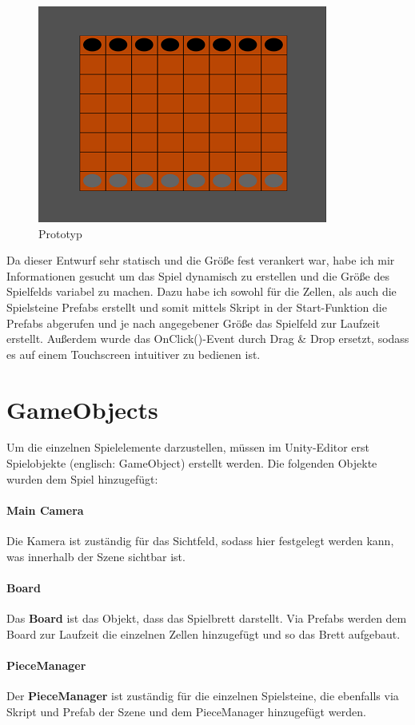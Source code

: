 \begin{figure}[h]
	\centering
	\includegraphics{img/Prototyp}
	\caption{Prototyp}
	\label{fig:Prototyp}
\end{figure}

Da dieser Entwurf sehr statisch und die Größe fest verankert war, habe ich mir Informationen gesucht um das Spiel dynamisch zu erstellen und die Größe des Spielfelds variabel zu machen. Dazu habe ich sowohl für die Zellen, als auch die Spielsteine Prefabs erstellt und somit mittels Skript in der Start-Funktion die Prefabs abgerufen und je nach angegebener Größe das Spielfeld zur Laufzeit erstellt.
Außerdem wurde das OnClick()-Event durch Drag \& Drop ersetzt, sodass es auf einem Touchscreen intuitiver zu bedienen ist.
\section{GameObjects}
\label{ch:Implementierung:sec:GameObjects}
Um die einzelnen Spielelemente darzustellen, müssen im Unity-Editor erst Spielobjekte (englisch: GameObject) erstellt werden. Die folgenden Objekte wurden dem Spiel hinzugefügt:
\paragraph{Main Camera}
Die Kamera ist zuständig für das Sichtfeld, sodass hier festgelegt werden kann, was innerhalb der Szene sichtbar ist.
\paragraph{Board}
Das \textbf{Board} ist das Objekt, dass das Spielbrett darstellt. Via Prefabs werden dem Board zur Laufzeit die einzelnen Zellen hinzugefügt und so das Brett aufgebaut.
\paragraph{PieceManager}
Der \textbf{PieceManager} ist zuständig für die einzelnen Spielsteine, die ebenfalls via Skript und Prefab der Szene und dem PieceManager hinzugefügt werden.

